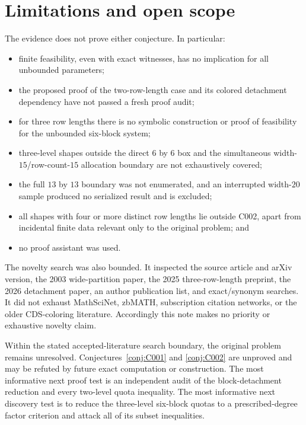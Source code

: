 \documentclass[11pt]{amsart}
\theoremstyle{definition}
\begin{document}
\section{Limitations and open scope}

The evidence does not prove either conjecture.  In particular:
\begin{itemize}
 \item finite feasibility, even with exact witnesses, has no implication for
 all unbounded parameters;
 \item the proposed proof of the two-row-length case and its colored
 detachment dependency have not passed a fresh proof audit;
 \item for three row lengths there is no symbolic construction or proof of
 feasibility for the unbounded six-block system;
 \item three-level shapes outside the direct $6$ by $6$ box and the
 simultaneous width-$15$/row-count-$15$ allocation boundary are not
 exhaustively covered;
 \item the full $13$ by $13$ boundary was not enumerated, and an interrupted
 width-$20$ sample produced no serialized result and is excluded;
 \item all shapes with four or more distinct row lengths lie outside C002,
 apart from incidental finite data relevant only to the original problem;
 and
 \item no proof assistant was used.
\end{itemize}

The novelty search was also bounded.  It inspected the source article and
arXiv version, the 2003 wide-partition paper, the 2025 three-row-length
preprint, the 2026 detachment paper, an author publication list, and
exact/synonym searches.  It did not exhaust MathSciNet, zbMATH, subscription
citation networks, or the older CDS-coloring literature.  Accordingly this
note makes no priority or exhaustive novelty claim.

Within the stated accepted-literature search boundary, the original problem
remains unresolved.  Conjectures~\ref{conj:C001} and \ref{conj:C002} are
unproved and may be refuted by future exact computation or construction.  The
most informative next proof test is an independent
audit of the block-detachment reduction and every two-level quota inequality.
The most informative next discovery test is to reduce the three-level
six-block quotas to a prescribed-degree factor criterion and attack all of
its subset inequalities.
\end{document}
